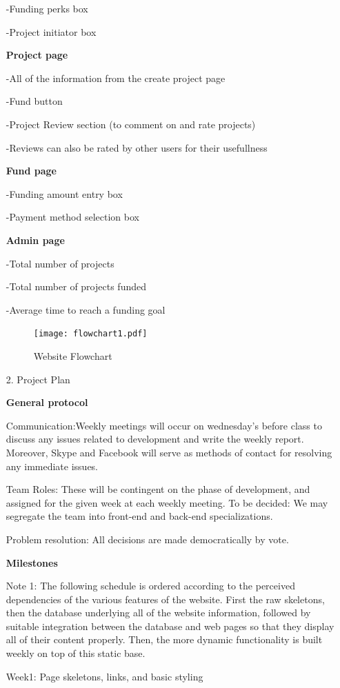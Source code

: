 \documentclass[12pt]{article}
\begin{document}
\begin{enumerate}
-Funding perks box

-Project initiator  box

\textbf{Project page}

-All of the information from the create project page

-Fund button

-Project Review section (to comment on and rate projects)

-Reviews can also be rated by other users for their usefullness

\textbf{Fund page}

-Funding amount entry box

-Payment method selection box

\textbf{Admin page}

-Total number of projects

-Total number of projects funded

-Average time to reach a funding goal

\begin{figure}[ht!]
\centering
\texttt{[image: flowchart1.pdf]}
\caption{Website Flowchart \label{overflow}}
\end{figure}


\item[2.] Project Plan

\textbf{General protocol}

Communication:Weekly meetings will occur on wednesday's before class to discuss any issues related to development and write the weekly report. Moreover, Skype and Facebook will serve as methods of contact for resolving any immediate issues.

Team Roles: These will be contingent on the phase of development, and assigned for the given week at each weekly meeting. To be decided: We may segregate the team into front-end and back-end specializations.

Problem resolution: All decisions are made democratically by vote.

\textbf{Milestones}

Note 1: The following schedule is ordered according to the perceived dependencies of the various features of the website. First the raw skeletons, then the database underlying all of the website information, followed by suitable integration between the database and web pages so that they display all of their content properly. Then, the more dynamic functionality is built weekly on top of this static base. 

Week1: Page skeletons, links, and basic styling


\end{enumerate}
\end{document}
